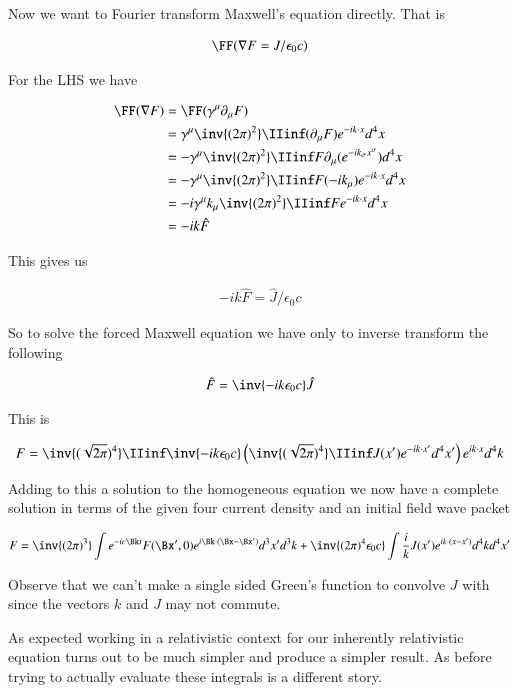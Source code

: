 Now we want to Fourier transform Maxwell's equation directly.  That is

\begin{align*}
\FF(\grad F = J/\epsilon_0 c)
\end{align*}

For the LHS we have

\begin{align*}
\FF(\grad F)
&= \FF(\gamma^\mu \partial_\mu F) \\
&= \gamma^\mu \inv{(2\pi)^2} \IIinf (\partial_\mu F) e^{ - i k \cdot x } d^4 x \\
&= -\gamma^\mu \inv{(2\pi)^2} \IIinf F \partial_\mu (e^{ - i k_\sigma x^\sigma }) d^4 x \\
&= -\gamma^\mu \inv{(2\pi)^2} \IIinf F (-i k_\mu ) e^{ - i k \cdot x } d^4 x \\
&= -i \gamma^\mu k_\mu \inv{(2\pi)^2} \IIinf F e^{ - i k \cdot x } d^4 x \\
&= -i k \hat{F}
\end{align*}

This gives us

\begin{align*}
-i k \hat{F} = \hat{J}/\epsilon_0 c
\end{align*}

So to solve the forced Maxwell equation we have only to inverse transform the following

\begin{align*}
\hat{F} = \inv{ -i k \epsilon_0 c} \hat{J}
\end{align*}

This is 

\begin{align*}
{F} 
&= \inv{(\sqrt{2\pi})^4} \IIinf \inv{ -i k \epsilon_0 c} \left( \inv{(\sqrt{2\pi})^4} \IIinf J(x') e^{ -i k \cdot x' } d^4 x' \right) e^{ i k \cdot x } d^4 k \\
\end{align*}

Adding to this a solution to the homogeneous equation we now have a complete solution in terms of the given four current density and an
initial field wave packet

\begin{align*}
{F} &= 
\inv{({2\pi})^3} \int e^{ -i c \Bk t } F(\Bx', 0) e^{ i \Bk \cdot (\Bx-\Bx') } d^3 x' d^3 k  
+
\inv{ ({2\pi})^4 \epsilon_0 c} \int \frac{i}{ k } J(x') e^{ i k \cdot (x - x') } d^4 k d^4 x' \\
\end{align*}

Observe that we can't make a single sided Green's function to convolve $J$ with since the vectors $k$ and $J$ may not commute.

As expected working in a relativistic context for our inherently relativistic equation turns out to be much simpler and produce a simpler result.  As before 
trying to actually evaluate these integrals is a different story.

